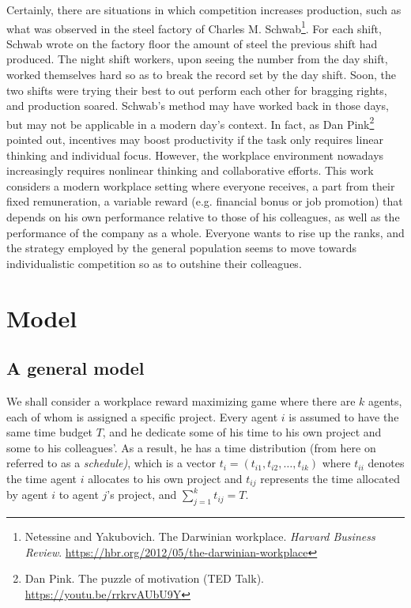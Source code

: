 \documentclass[10pt, a4paper]{article}
\begin{document}
	Certainly, there are situations in which competition increases production, such as what was observed in the steel factory of Charles M. Schwab\footnote{Netessine and Yakubovich. The Darwinian workplace. \textit{Harvard Business Review}. \url{https://hbr.org/2012/05/the-darwinian-workplace}}. For each shift, Schwab wrote on the factory floor the amount of steel the previous shift had produced. The night shift workers, upon seeing the number from the day shift, worked themselves hard so as to break the record set by the day shift. Soon, the two shifts were trying their best to out perform each other for bragging rights, and production soared. Schwab's method may have worked back in those days, but may not be applicable in a modern day's context. In fact, as Dan Pink\footnote{Dan Pink. The puzzle of motivation (TED Talk). \url{https://youtu.be/rrkrvAUbU9Y}} pointed out, incentives may boost productivity if the task only requires linear thinking and individual focus. However, the workplace environment nowadays increasingly requires nonlinear thinking and collaborative efforts. This work considers a modern workplace setting where everyone receives, a part from their fixed remuneration, a variable reward (e.g. financial bonus or job promotion) that depends on his own performance relative to those of his colleagues, as well as the performance of the company as a whole. Everyone wants to rise up the ranks, and the strategy employed by the general population seems to move towards individualistic competition so as to outshine their colleagues.
	
	\section{Model}\label{sec:model}
	\subsection{A general model}
	We shall consider a workplace reward maximizing game where there are $k$ agents, each of whom is assigned a specific project. Every agent $i$ is assumed to have the same time budget $T$, and he dedicate some of his time to his own project and some to his colleagues'. As a result, he has a time distribution (from here on referred to as a \textit{schedule)}, which is a vector $t_i=(t_{i1},t_{i2},\ldots,t_{ik})$  where $t_{ii}$ denotes the time agent $i$ allocates to his own project and $t_{ij}$ represents the time allocated by agent $i$ to agent $j$'s project, and $\sum_{j=1}^{k}t_{ij}=T$.	
	
\end{document}
